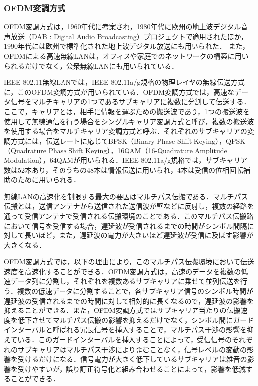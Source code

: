 \documentclass[master]{kuisthesis}		%
\begin{document}
\subsubsection{OFDM変調方式}
OFDM変調方式は，1960年代に考案され，1980年代に欧州の地上波デジタル音声放送（DAB : Digital Audio Broadcasting）プロジェクトで適用されたほか，1990年代には欧州で標準化された地上波デジタル放送にも用いられた．
また，OFDMによる高速無線LANは，オフィスや家庭でのネットワークの構築に用いられるだけでなく，公衆無線LANにも用いられている．

IEEE 802.11無線LANでは，IEEE 802.11a/g規格の物理レイヤの無線伝送方式に，このOFDM変調方式が用いられている．OFDM変調方式では，高速なデータ信号をマルチキャリアの1つであるサブキャリアに複数に分割して伝送する．
ここで，キャリアとは，相手に情報を運ぶための搬送波であり，1つの搬送波を使用して無線通信を行う場合をシングルキャリア変調方式と呼び，複数の搬送波を使用する場合をマルチキャリア変調方式と呼ぶ．それぞれのサブキャリアの変調方式には，伝送レートに応じてBPSK（Binary Phase Shift Keying），QPSK（Quadrature Phase Shift Keying），16QAM（16-Quadrature Amplitude Modulation），64QAMが用いられる．IEEE 802.11a/g規格では，サブキャリア数は52本あり，そのうちの48本は情報伝送に用いられ，4本は受信の位相回転補助のために用いられる．

無線LANの高速化を制限する最大の要因はマルチパス伝搬である．マルチパス伝搬とは，送信アンテナから送信された送信波が壁などに反射し，複数の経路を通って受信アンテナで受信される伝搬環境のことである．このマルチパス伝搬路において信号を受信する場合，遅延波が受信されるまでの時間がシンボル間隔に対して長いほど，また，遅延波の電力が大きいほど遅延波が受信に及ぼす影響が大きくなる．

OFDM変調方式では，以下の理由により，このマルチパス伝搬環境において伝送速度を高速化することができる．OFDM変調方式は，高速のデータを複数の低速データ列に分割し，それぞれを複数あるサブキャリアに乗せて並列伝送を行う．複数の低速データに分割することで，各サブキャリア信号のシンボル時間が遅延波の受信されるまでの時間に対して相対的に長くなるので，遅延波の影響を抑えることができる．また，OFDM変調方式ではサブキャリア当たりの伝搬速度を低下させてマルチパス伝搬の影響を抑えるだけでなく，シンボル間にガードインターバルと呼ばれる冗長信号を挿入することで，マルチパス干渉の影響を抑えている．このガードインターバルを挿入することによって，受信信号のそれぞれのサブキャリアはマルチパス干渉により歪むことなく，信号レベルの変動の影響を受けるだけになる．信号電力が大きく低下しているサブキャリアは雑音の影響を受けやすいが，誤り訂正符号化と組み合わせることによって，影響を低減することができる．
\end{document}
